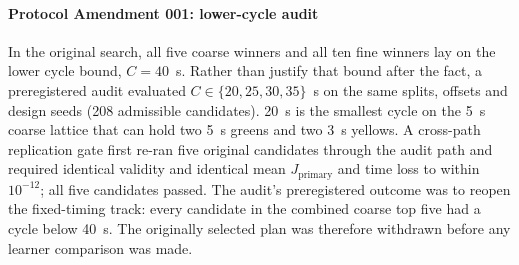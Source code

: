 \documentclass[review,12pt]{elsarticle}
\newcommand{\Jp}{J_{\mathrm{primary}}}
\begin{document}
\paragraph{Protocol Amendment 001: lower-cycle audit} In the original
search, all five coarse winners and all ten fine winners lay on the
lower cycle bound, $C=40$~s. Rather than justify that bound after the
fact, a preregistered audit evaluated
$C\in\{20,25,30,35\}$~s on the same splits, offsets and design seeds
(208 admissible candidates). 20~s is the smallest cycle on the 5~s
coarse lattice that can hold two 5~s greens and two 3~s yellows. A
cross-path replication gate first re-ran five original candidates
through the audit path and required identical validity and identical
mean $\Jp$ and time loss to within $10^{-12}$; all five candidates
passed. The audit's preregistered outcome was to reopen the
fixed-timing track: every candidate in the combined coarse top five had
a cycle below 40~s. The originally selected plan was therefore
withdrawn before any learner comparison was made.
\end{document}
